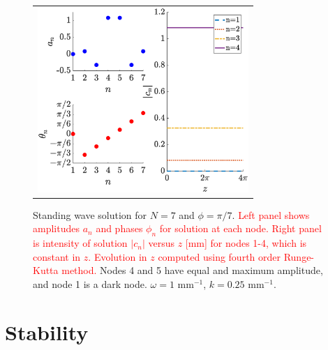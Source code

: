 \documentclass[reprint, amsmath,amssymb,aps,pra]{revtex4-2}
\renewcommand{\revised}[1]{ \textcolor{red}{#1} }
\begin{document}
\begin{figure}
\begin{center}
\begin{tabular}{c}
\includegraphics[width=8cm]{oddhole7.eps}
\end{tabular}
\end{center}
\caption{Standing wave solution for $N = 7$ and $\phi = \pi/7$. \revised{Left panel shows amplitudes $a_n$ and phases $\phi_n$ for solution at each node. Right panel is intensity of solution $|c_n|$ versus $z$ [mm] for nodes 1-4, which is constant in $z$. Evolution in $z$ computed using fourth order Runge-Kutta method.}  Nodes 4 and 5 have equal and maximum amplitude, and node 1 is a dark node. $\omega = 1 \text{ mm}^{-1}$, $k = 0.25 \text{ mm}^{-1}$.}
\label{fig:oddhole7}
\end{figure}

\section{Stability}\label{sec:stability}
\end{document}
